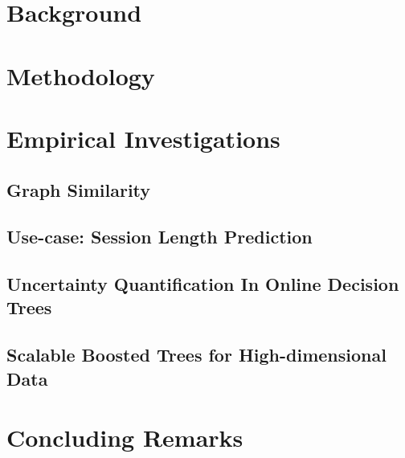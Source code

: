 \documentclass[g5paper,twoside,phd,electronic]{kthesis}
\begin{document}
\frontmatter
\maketitle
\makecopyright
\makededication



\tableofcontents*
\listoffigures
\listoftables
\listofalgorithms
\mainmatter

\newpage
\part{Background}

\newpage

\newpage

\newpage

\newpage
\part{Methodology}

\newpage
\part{Empirical Investigations}
\chapter{Graph Similarity}

\newpage
\chapter{Use-case: Session Length Prediction}

\newpage
\chapter{Uncertainty Quantification In Online Decision Trees}

\newpage
\chapter{Scalable Boosted Trees for High-dimensional Data}

\newpage
\part{Concluding Remarks}

\newpage

\backmatter
\printindex

\end{document}
